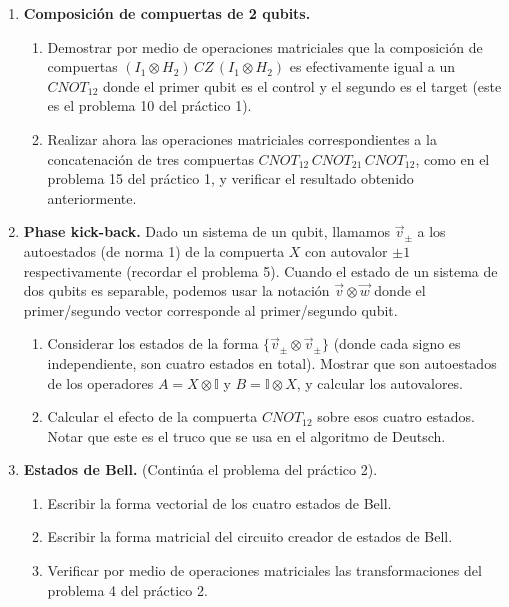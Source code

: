 \documentclass[a4paper,11pt,spanish]{article}
\begin{document}
\begin{enumerate}
\begin{enumerate}
   \end{enumerate}
   
   \item {\bf Composici\'on de compuertas de 2 qubits.}
   
   \begin{enumerate}
   \item Demostrar por medio de operaciones matriciales que la composici\'on de compuertas $(I_1 \otimes H_2)\, CZ \, (I_1 \otimes H_2)$ es efectivamente igual a un $CNOT_{12}$ donde el primer qubit es el control y el segundo es el target (este es el problema 10 del práctico 1).
   
   \item Realizar ahora las operaciones matriciales correspondientes a la concatenaci\'on de tres compuertas $CNOT_{12} \, CNOT_{21}\, CNOT_{12}$, como en el problema 15 del práctico 1, y verificar el resultado obtenido anteriormente.
  \end{enumerate}

  \item {\bf Phase kick-back.} Dado un sistema de un qubit, llamamos $\vec v_{\pm}$ a los autoestados (de norma 1) de la compuerta $X$ con autovalor $\pm 1$ respectivamente (recordar el problema 5). Cuando el estado de un sistema de dos qubits es separable, podemos usar la notaci\'on $\vec v \otimes \vec w$ donde el primer/segundo vector corresponde al primer/segundo qubit. 
  \begin{enumerate}
   \item Considerar los estados de la forma $\{\vec v_{\pm}\otimes \vec v_{\pm}\}$ (donde cada signo es independiente, son cuatro estados en total). Mostrar que son autoestados de los operadores $A=X\otimes\mathbb{I}$ y $B=\mathbb{I}\otimes X$, y calcular los autovalores.
   \item Calcular el efecto de la compuerta $CNOT_{12}$ sobre esos cuatro estados. Notar que este es el truco que se usa en el algoritmo de Deutsch.
  \end{enumerate}
  
  \item {\bf Estados de Bell.} (Contin\'ua el problema del práctico 2).
  
  \begin{enumerate}
   \item Escribir la forma vectorial de los cuatro estados de Bell.
   \item Escribir la forma matricial del circuito creador de estados de Bell.
   \item Verificar por medio de operaciones matriciales las transformaciones del problema 4 del práctico 2.
  \end{enumerate}


\end{enumerate}
\end{document}
